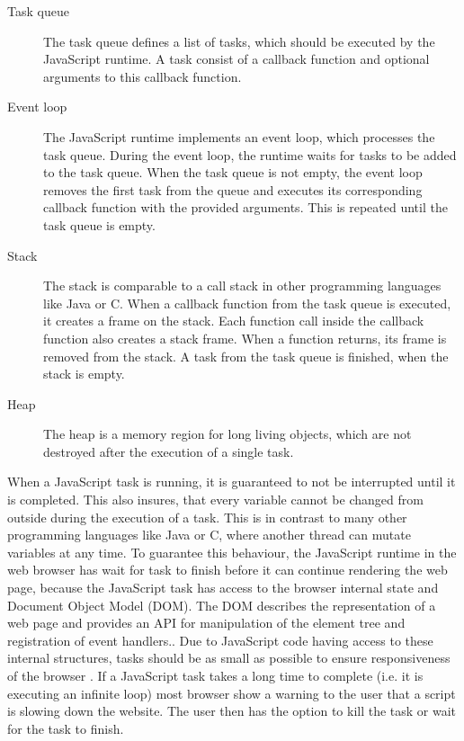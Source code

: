 \documentclass[
	ruledheaders=section,%
	class=report,%
	thesis={type=bachelor},%
	accentcolor=9c,%
	custommargins=true,%
	marginpar=false,%
	parskip=half-,%
	fontsize=11pt,%
]{tudapub}
\begin{document}
  \begin{description}
  \item[Task queue] The task queue defines a list of tasks, which should be executed by the JavaScript runtime. A task consist of a callback function and optional arguments to this callback function.
  \item[Event loop] The JavaScript runtime implements an event loop, which processes the task queue. During the event loop, the runtime waits for tasks to be added to the task queue. When the task queue is not empty, the event loop removes the first task from the queue and executes its corresponding callback function with the provided arguments. This is repeated until the task queue is empty.
  \item[Stack] The stack is comparable to a call stack in other programming languages like Java or C. When a callback function from the task queue is executed, it creates a frame on the stack. Each function call inside the callback function also creates a stack frame. When a function returns, its frame is removed from the stack. A task from the task queue is finished, when the stack is empty.
  \item[Heap] The heap is a memory region for long living objects, which are not destroyed after the execution of a single task.
  \end{description}

  When a JavaScript task is running, it is guaranteed to not be interrupted until it is completed. This also insures, that every variable cannot be changed from outside during the execution of a task. This is in contrast to many other programming languages like Java or C, where another thread can mutate variables at any time. To guarantee this behaviour, the JavaScript runtime in the web browser has wait for task to finish before it can continue rendering the web page, because the JavaScript task has access to the browser internal state and Document Object Model (DOM).  The DOM describes the representation of a web page and provides an API for manipulation of the element tree and registration of event handlers.. Due to JavaScript code having access to these internal structures, tasks should be as small as possible to ensure responsiveness of the browser \cite{chrome-rail-model}. If a JavaScript task takes a long time to complete (i.e. it is executing an infinite loop) most browser show a warning to the user that a script is slowing down the website. The user then has the option to kill the task or wait for the task to finish.
\end{document}
